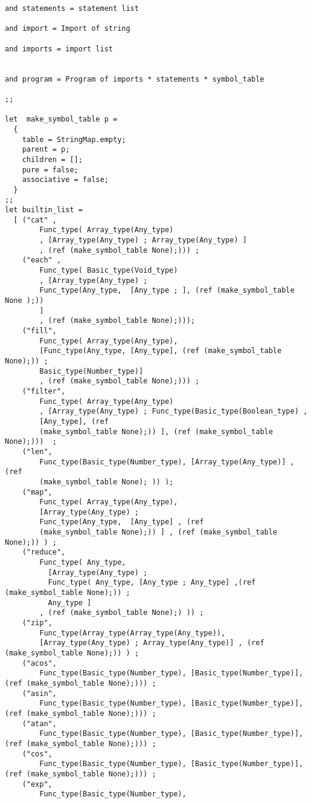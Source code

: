 \begin{verbatim}
and statements = statement list

and import = Import of string

and imports = import list


and program = Program of imports * statements * symbol_table

;;

let  make_symbol_table p = 
  {
    table = StringMap.empty;
    parent = p;
    children = [];
    pure = false;
    associative = false;
  }
;;
let builtin_list = 
  [ ("cat" ,  
        Func_type( Array_type(Any_type)
        , [Array_type(Any_type) ; Array_type(Any_type) ] 
        , (ref (make_symbol_table None);))) ;
    ("each" ,  
        Func_type( Basic_type(Void_type)
        , [Array_type(Any_type) ;
        Func_type(Any_type,  [Any_type ; ], (ref (make_symbol_table None );))
        ]
        , (ref (make_symbol_table None);)));
    ("fill", 
        Func_type( Array_type(Any_type),
        [Func_type(Any_type, [Any_type], (ref (make_symbol_table None);)) ;
        Basic_type(Number_type)]
        , (ref (make_symbol_table None);))) ; 
    ("filter", 
        Func_type( Array_type(Any_type)
        , [Array_type(Any_type) ; Func_type(Basic_type(Boolean_type) ,
        [Any_type], (ref
        (make_symbol_table None);)) ], (ref (make_symbol_table None);)))  ;
    ("len", 
        Func_type(Basic_type(Number_type), [Array_type(Any_type)] , (ref
        (make_symbol_table None); )) );
    ("map",  
        Func_type( Array_type(Any_type), 
        [Array_type(Any_type) ; 
        Func_type(Any_type,  [Any_type] , (ref
        (make_symbol_table None);)) ] , (ref (make_symbol_table None);)) ) ;
    ("reduce",
        Func_type( Any_type,
          [Array_type(Any_type) ; 
          Func_type( Any_type, [Any_type ; Any_type] ,(ref (make_symbol_table None);)) ;
          Any_type ]
        , (ref (make_symbol_table None);) )) ;
    ("zip",
        Func_type(Array_type(Array_type(Any_type)), 
        [Array_type(Any_type) ; Array_type(Any_type)] , (ref (make_symbol_table None);)) ) ;
    ("acos",
        Func_type(Basic_type(Number_type), [Basic_type(Number_type)], (ref (make_symbol_table None);))) ;
    ("asin",
        Func_type(Basic_type(Number_type), [Basic_type(Number_type)], (ref (make_symbol_table None);))) ;
    ("atan",
        Func_type(Basic_type(Number_type), [Basic_type(Number_type)], (ref (make_symbol_table None);))) ;
    ("cos",
        Func_type(Basic_type(Number_type), [Basic_type(Number_type)], (ref (make_symbol_table None);))) ;
    ("exp",
        Func_type(Basic_type(Number_type), 

\end{verbatim}
